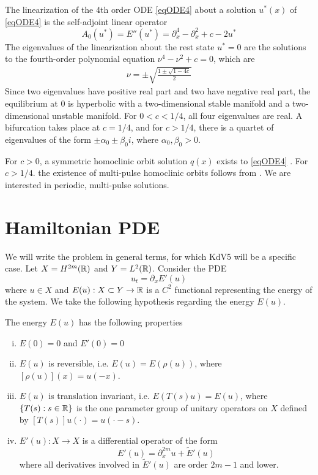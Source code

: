 \documentclass[thesis.tex]{subfiles}
\begin{document}
The linearization of the 4th order ODE \eqref{eqODE4} about a solution $u^*(x)$ of \eqref{eqODE4} is the self-adjoint linear operator
\begin{equation}\label{defA0}
A_0(u^*) = E''(u^*) = \partial_x^4 - \partial_x^2 + c - 2 u^* 
\end{equation}
The eigenvalues of the linearization about the rest state $u^* = 0$ are the solutions to the fourth-order polynomial equation $\nu^4 - \nu^2 + c = 0$, which are
\begin{align}\label{specA0}
\nu = \pm \sqrt{ \frac{1 \pm \sqrt{1 - 4c} }{2}}
\end{align}
Since two eigenvalues have positive real part and two have negative real part, the equilibrium at 0 is hyperbolic with a two-dimensional stable manifold and a two-dimensional unstable manifold. For $0 < c < 1/4$, all four eigenvalues are real. A bifurcation takes place at $c = 1/4$, and for $c > 1/4$, there is a quartet of eigenvalues of the form $\pm \alpha_0 \pm \beta_0 i$, where $\alpha_0, \beta_0 > 0$.

For $c > 0$, a symmetric homoclinic orbit solution $q(x)$ exists to \eqref{eqODE4} \cite[Theorem 2.1]{Pelinovsky2007}. For $c > 1/4$. the existence of multi-pulse homoclinic orbits follows from \cite{SandstedeStrut}. We are interested in periodic, multi-pulse solutions.

\section{Hamiltonian PDE}

We will write the problem in general terms, for which KdV5 will be a specific case. Let $X = H^{2m}({\mathbb R})$ and $Y = L^2({\mathbb R})$. Consider the PDE
\begin{equation}\label{genPDE}
u_t = \partial_x E'(u)
\end{equation}
where $u \in X$ and $E(u): X \subset Y \rightarrow {\mathbb R}$ is a $C^2$ functional representing the energy of the system. We take the following hypothesis regarding the energy $E(u)$.

\begin{hypothesis}\label{Ehyp}
The energy $E(u)$ has the following properties
\begin{enumerate}[(i)]
\item $E(0) = 0$ and $E'(0) = 0$
\item $E(u)$ is reversible, i.e. $E(u) = E(\rho(u))$, where $[\rho(u)](x) = u(-x)$.
\item $E(u)$ is translation invariant, i.e. $E(T(s)u) = E(u)$, where $\{T(s) : s \in {\mathbb R} \}$ is the one parameter group of unitary operators on $X$ defined by $[T(s)]u(\cdot) = u(\cdot - s)$.
\item $E'(u): X \rightarrow X$ is a differential operator of the form
\begin{equation}\label{Eprimeuform}
E'(u) = \partial_x^{2m}u + \tilde{E}'(u)
\end{equation}
where all derivatives involved in $\tilde{E}'(u)$ are order $2m-1$ and lower.
\end{enumerate}
\end{hypothesis}
\end{document}
